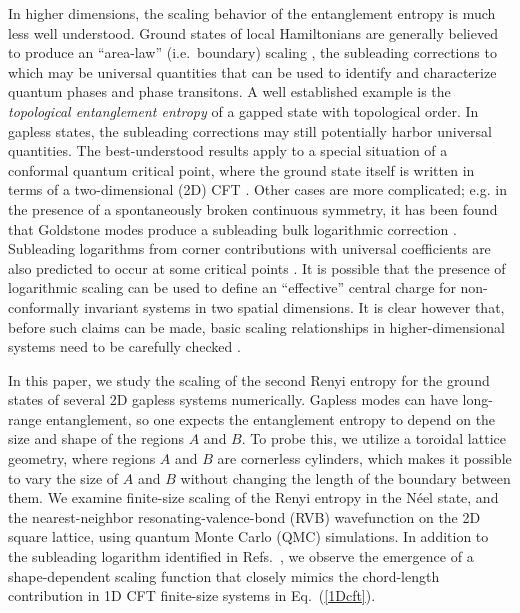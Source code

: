 \documentclass[prl,aps,twocolumn,floatfix,amsmath,amssymb,superscriptaddress,tightenlines]{revtex4}
\begin{document}
In higher dimensions, the scaling behavior of the
entanglement entropy is much less well understood.  Ground states of local Hamiltonians
are generally believed to produce an ``area-law'' (i.e.\ boundary) scaling \cite{ALreview}, the subleading corrections
to which may be universal quantities that can be used to identify and characterize
quantum phases and phase transitons.
A well established example is the {\it topological entanglement entropy} 
\cite{Alioscia1,Alioscia2,KP,LW} of a gapped state with topological order.
In gapless states, the subleading corrections may still potentially harbor universal 
quantities.  %
The best-understood results apply to a special situation of a conformal quantum critical point, where the ground state itself is written in terms of a two-dimensional (2D) CFT  \cite{Moore06,Hsu08,Misguich}.
Other cases are more complicated; e.g.
in the presence of a spontaneously broken continuous symmetry, it has been found that Goldstone modes 
produce a subleading bulk logarithmic correction \cite{HeisLog,MaxLog}.
Subleading logarithms from corner contributions with universal coefficients are also predicted to occur at some critical points \cite{Moore06,logcorner,Max}.
It is possible that the presence of logarithmic scaling can be used to define an ``effective'' central
charge for non-conformally invariant systems in two spatial dimensions. 
It is clear however that, before such claims can be made,
basic scaling relationships in
higher-dimensional systems need to be carefully checked \cite{EE_CFT}.

In this paper, we study the scaling of the second Renyi entropy for the ground states of several 2D gapless systems numerically.  Gapless modes can have long-range entanglement, so one expects the entanglement entropy to depend on the size and shape of the regions $A$ and $B$. To probe this, we utilize a toroidal lattice geometry, where regions $A$ and $B$ are cornerless cylinders, which makes it possible to vary the size of $A$ and $B$ without changing the length of the boundary between them.  We examine finite-size scaling of the Renyi entropy in the N\'eel state, and the nearest-neighbor resonating-valence-bond (RVB) wavefunction
on the 2D square lattice, using quantum Monte Carlo (QMC) simulations.
In addition to the subleading logarithm identified in Refs.~\cite{HeisLog,MaxLog},
we observe the emergence of a shape-dependent scaling function that closely mimics the chord-length contribution in 1D CFT finite-size systems in Eq.~(\ref{1Dcft}).
\end{document}
